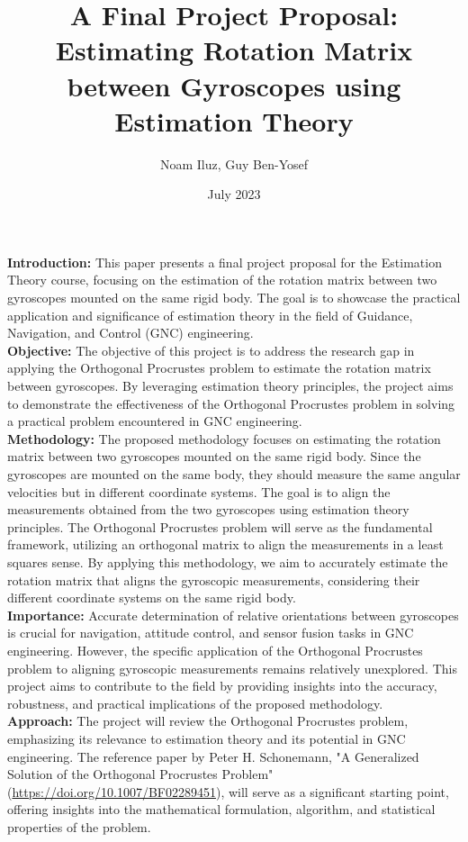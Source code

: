 \documentclass{article}
\title{A Final Project Proposal: Estimating Rotation Matrix between Gyroscopes using Estimation Theory}
\author{Noam Iluz, Guy Ben-Yosef}
\date{July 2023}
\begin{document}
\maketitle

\textbf{Introduction:}
This paper presents a final project proposal for the Estimation Theory course, focusing on the estimation of the rotation matrix between two gyroscopes mounted on the same rigid body. The goal is to showcase the practical application and significance of estimation theory in the field of Guidance, Navigation, and Control (GNC) engineering.
\\

\textbf{Objective:}
The objective of this project is to address the research gap in applying the Orthogonal Procrustes problem to estimate the rotation matrix between gyroscopes. By leveraging estimation theory principles, the project aims to demonstrate the effectiveness of the Orthogonal Procrustes problem in solving a practical problem encountered in GNC engineering.
\\

\textbf{Methodology:}
The proposed methodology focuses on estimating the rotation matrix between two gyroscopes mounted on the same rigid body. Since the gyroscopes are mounted on the same body, they should measure the same angular velocities but in different coordinate systems. The goal is to align the measurements obtained from the two gyroscopes using estimation theory principles. The Orthogonal Procrustes problem will serve as the fundamental framework, utilizing an orthogonal matrix to align the measurements in a least squares sense. By applying this methodology, we aim to accurately estimate the rotation matrix that aligns the gyroscopic measurements, considering their different coordinate systems on the same rigid body.
\\

\textbf{Importance:}
Accurate determination of relative orientations between gyroscopes is crucial for navigation, attitude control, and sensor fusion tasks in GNC engineering. However, the specific application of the Orthogonal Procrustes problem to aligning gyroscopic measurements remains relatively unexplored. This project aims to contribute to the field by providing insights into the accuracy, robustness, and practical implications of the proposed methodology.
\\

\textbf{Approach:}
The project will review the Orthogonal Procrustes problem, emphasizing its relevance to estimation theory and its potential in GNC engineering. The reference paper by Peter H. Schonemann, "A Generalized Solution of the Orthogonal Procrustes Problem" (\href{https://doi.org/10.1007/BF02289451}{https://doi.org/10.1007/BF02289451}), will serve as a significant starting point, offering insights into the mathematical formulation, algorithm, and statistical properties of the problem.
\\
\end{document}

